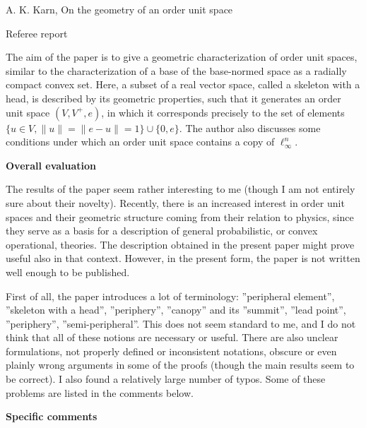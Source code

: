 \documentclass[12pt]{article}
\begin{document}
\begin{center}
{\large A. K. Karn,  On the geometry of an order unit space
 }

\end{center}
\medskip

\centerline{Referee report}

\bigskip

The aim of the paper is to give a geometric characterization of order unit spaces, similar
to the characterization of a base of the base-normed space as a radially compact convex
set. Here, a subset of a real vector space, called a skeleton with a head, is described by
its geometric properties, such that it generates an order unit space $(V,V^+, e)$, in which it
corresponds precisely to the set of elements  $\{u\in V, \|u\|=\|e-u\|=1\}\cup\{0,e\}$. 
The author also discusses some conditions under which an order unit space contains a copy
of $\ell_\infty^n$. 

\medskip
\noindent
\textbf{Overall evaluation}
\medskip

The results of the paper seem rather interesting to me (though I am not entirely sure about their
novelty). Recently, there is an increased interest  in  order unit spaces and their
geometric structure coming from their relation to physics, since  they serve as a basis for a description of general
probabilistic, or convex operational, theories. The description obtained in the present
paper might prove useful also in that context. However, in the present form, the paper is not written well
enough to be published. 

\medskip

First of all, the paper introduces a lot of  terminology: ''peripheral element'',
''skeleton with a head'', ''periphery'', ''canopy'' and its ''summit'', ''lead point'',
''periphery'', ''semi-peripheral''. This does not seem standard to me, and I do not think
that all of these notions are necessary or useful. There are also unclear formulations,
not properly defined or inconsistent notations, obscure or even plainly wrong arguments in some of the proofs
(though the main results seem to be correct). I also found a relatively large number of
typos. Some of these problems are listed in the comments below.





\medskip

\noindent
\textbf{Specific comments}
\end{document}
